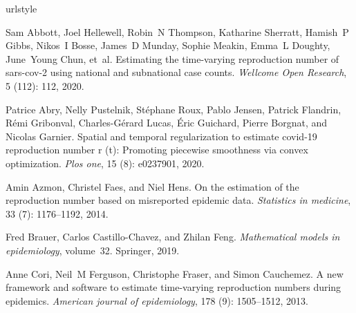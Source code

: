 \documentclass[10pt,letterpaper]{article}
\begin{document}
%
%
% 
\begin{thebibliography}{27}
  \providecommand{\natexlab}[1]{#1}
  \providecommand{\url}[1]{\texttt{#1}}
  \expandafter\ifx\csname urlstyle\endcsname\relax
    \providecommand{\doi}[1]{doi: #1}\else
    \providecommand{\doi}{doi: \begingroup \urlstyle{rm}\Url}\fi
  
  Sam Abbott, Joel Hellewell, Robin~N Thompson, Katharine Sherratt, Hamish~P
    Gibbs, Nikos~I Bosse, James~D Munday, Sophie Meakin, Emma~L Doughty,
    June~Young Chun, et~al.
  \newblock Estimating the time-varying reproduction number of sars-cov-2 using
    national and subnational case counts.
  \newblock \emph{Wellcome Open Research}, 5 (112): 112, 2020.
  
  Patrice Abry, Nelly Pustelnik, St{\'e}phane Roux, Pablo Jensen, Patrick
    Flandrin, R{\'e}mi Gribonval, Charles-G{\'e}rard Lucas, {\'E}ric Guichard,
    Pierre Borgnat, and Nicolas Garnier.
  \newblock Spatial and temporal regularization to estimate covid-19 reproduction
    number r (t): Promoting piecewise smoothness via convex optimization.
  \newblock \emph{Plos one}, 15 (8): e0237901, 2020.
  
  Amin Azmon, Christel Faes, and Niel Hens.
  \newblock On the estimation of the reproduction number based on misreported
    epidemic data.
  \newblock \emph{Statistics in medicine}, 33 (7): 1176--1192,
    2014.
  
  Fred Brauer, Carlos Castillo-Chavez, and Zhilan Feng.
  \newblock \emph{Mathematical models in epidemiology}, volume~32.
  \newblock Springer, 2019.
  
  Anne Cori, Neil~M Ferguson, Christophe Fraser, and Simon Cauchemez.
  \newblock A new framework and software to estimate time-varying reproduction
    numbers during epidemics.
  \newblock \emph{American journal of epidemiology}, 178 (9):
    1505--1512, 2013.
  

\end{thebibliography}
\end{document}
